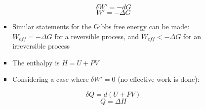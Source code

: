 \begin{itemize}
\begin{itemize}
\begin{itemize}
\begin{itemize}
                $$\delta W'=-dG$$
                $$W'=-\Delta G$$

              \item Similar statements for the Gibbs free energy can be made: $W_{eff}=-\Delta G$ for a reversible process, and $W_{eff}<-\Delta G$ for an irreversible process

              \item The enthalpy is $H=U+PV$

              \item Considering a case where $\delta W'=0$ (no effective work is done):

                $$\delta Q=d(U+PV)$$
                $$Q=\Delta H$$

            \end{itemize}

        \end{itemize}

    \end{itemize}

\end{itemize}





